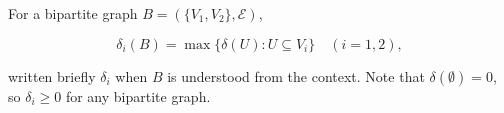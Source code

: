 For a bipartite graph $B = (\{V_1, V_2\}, \mathcal{E})$,

$$\delta_i(B) = \max\{\delta(U): U \subseteq V_i\} \quad (i = 1, 2),$$

written briefly $\delta_i$ when $B$ is understood from the context. Note that $\delta(\emptyset) = 0$, so $\delta_i \geq 0$ for any bipartite graph.